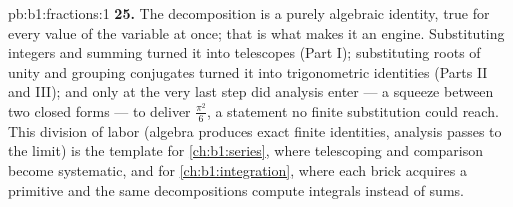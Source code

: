 \begin{solution}{pb:b1:fractions:1}
\textbf{25.} The decomposition is a purely algebraic identity,
true for every value of the variable at once; that is what makes
it an engine. Substituting integers and summing turned it into
telescopes (Part I); substituting roots of unity and grouping
conjugates turned it into trigonometric identities (Parts II and
III); and only at the very last step did analysis enter --- a
squeeze between two closed forms --- to deliver $\frac{\pi^2}6$,
a statement no finite substitution could reach. This division of
labor (algebra produces exact finite identities, analysis passes
to the limit) is the template for \cref{ch:b1:series}, where
telescoping and comparison become systematic, and for
\cref{ch:b1:integration}, where each brick acquires a primitive
and the same decompositions compute integrals instead of sums.
\end{solution}

